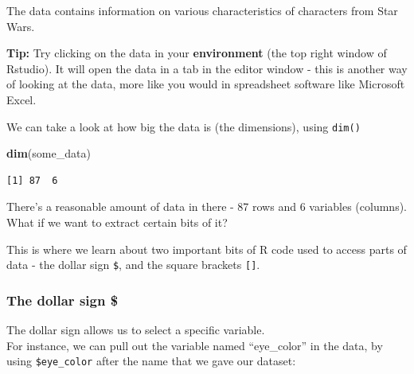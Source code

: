 \documentclass[]{book}
\newenvironment{Shaded}{\begin{snugshade}}{\end{snugshade}}
\newcommand{\KeywordTok}[1]{\textcolor[rgb]{0.13,0.29,0.53}{\textbf{#1}}}
\newcommand{\NormalTok}[1]{#1}
\newcommand{\OperatorTok}[1]{\textcolor[rgb]{0.81,0.36,0.00}{\textbf{#1}}}
\begin{document}
The data contains information on various characteristics of characters from Star Wars.

\textbf{Tip:} Try clicking on the data in your \textbf{environment} (the top right window of Rstudio). It will open the data in a tab in the editor window - this is another way of looking at the data, more like you would in spreadsheet software like Microsoft Excel.

We can take a look at how big the data is (the dimensions), using \texttt{dim()}

\begin{Shaded}
\begin{Highlighting}[]
\KeywordTok{dim}\NormalTok{(some_data)}
\end{Highlighting}
\end{Shaded}

\begin{verbatim}
[1] 87  6
\end{verbatim}

There's a reasonable amount of data in there - 87 rows and 6 variables (columns). What if we want to extract certain bits of it?

This is where we learn about two important bits of R code used to access parts of data - the dollar sign \texttt{\$}, and the square brackets \texttt{{[}{]}}.

\hypertarget{the-dollar-sign}{%
\subsubsection*{The dollar sign \$}\label{the-dollar-sign}}

The dollar sign allows us to select a specific variable.\\
For instance, we can pull out the variable named ``eye\_color'' in the data, by using \texttt{\$eye\_color} after the name that we gave our dataset:

\begin{Shaded}
\end{Shaded}
\end{document}
